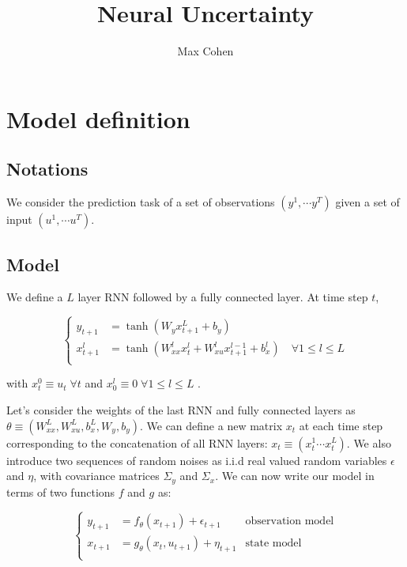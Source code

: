 \documentclass[10pt,a4paper]{report}
\begin{document}
\title{Neural Uncertainty}
\author{Max Cohen}

\chapter{Model definition}
\section{Notations}
We consider the prediction task of a set of observations $(y^1, \cdots y^T)$ given a set of input $(u^1, \cdots u^T)$.

\section{Model}
We define a $L$ layer RNN followed by a fully connected layer. At time step $t$,

\begin{equation*}
        \left\{
        \begin{aligned}
                y_{t+1}   & = \tanh(W_y x_{t+1}^L + b_y)                                                               \\
                x_{t+1}^l & = \tanh(W_{xx}^l x^{l}_{t} + W_{xu}^l x^{l-1}_{t+1} + b_x^l) \quad \forall 1 \leq l \leq L \\
        \end{aligned}
        \right.
\end{equation*}

with $x_{t}^0 \equiv u_{t} \; \forall t$ and $x_{0}^l \equiv 0 \; \forall 1 \leq l \leq L$ .

Let's consider the weights of the last RNN and fully connected layers as $\theta \equiv (W_{xx}^L, W_{xu}^L, b_x^L, W_y, b_y)$.
We can define a new matrix $x_t$ at each time step corresponding to the concatenation of all RNN layers: $x_t \equiv (x_t^1 \cdots x_t^L)$.
We also introduce two sequences of random noises as i.i.d real valued random variables $\epsilon$ and $\eta$, with covariance matrices $\Sigma_y$ and $\Sigma_x$.
We can now write our model in terms of two functions $f$ and $g$ as:

\begin{equation}
        \left\{
        \begin{aligned}
                y_{t+1} & = f_\theta(x_{t+1}) + \epsilon_{t+1}    & \text{observation model} \\
                x_{t+1} & = g_\theta(x_{t}, u_{t+1}) + \eta_{t+1} & \text{state model}       \\
        \end{aligned}
        \right.
\end{equation}
\end{document}
